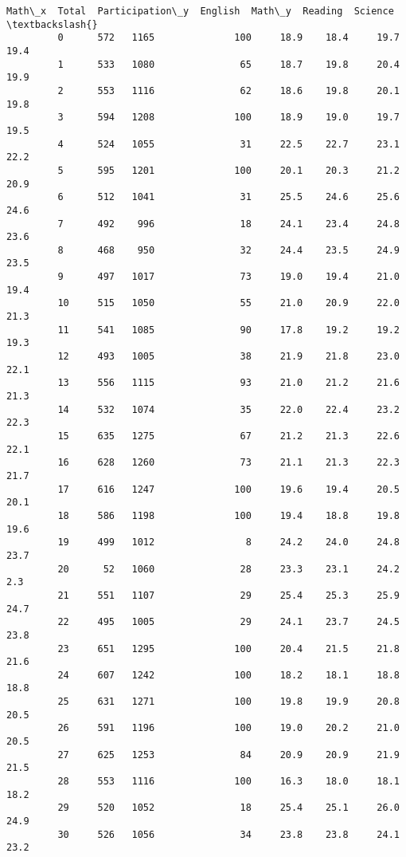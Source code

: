 \documentclass[11pt]{article}
\begin{document}
\begin{Verbatim}[commandchars=\\\{\}]
             Math\_x  Total  Participation\_y  English  Math\_y  Reading  Science  \textbackslash{}
         0      572   1165              100     18.9    18.4     19.7     19.4   
         1      533   1080               65     18.7    19.8     20.4     19.9   
         2      553   1116               62     18.6    19.8     20.1     19.8   
         3      594   1208              100     18.9    19.0     19.7     19.5   
         4      524   1055               31     22.5    22.7     23.1     22.2   
         5      595   1201              100     20.1    20.3     21.2     20.9   
         6      512   1041               31     25.5    24.6     25.6     24.6   
         7      492    996               18     24.1    23.4     24.8     23.6   
         8      468    950               32     24.4    23.5     24.9     23.5   
         9      497   1017               73     19.0    19.4     21.0     19.4   
         10     515   1050               55     21.0    20.9     22.0     21.3   
         11     541   1085               90     17.8    19.2     19.2     19.3   
         12     493   1005               38     21.9    21.8     23.0     22.1   
         13     556   1115               93     21.0    21.2     21.6     21.3   
         14     532   1074               35     22.0    22.4     23.2     22.3   
         15     635   1275               67     21.2    21.3     22.6     22.1   
         16     628   1260               73     21.1    21.3     22.3     21.7   
         17     616   1247              100     19.6    19.4     20.5     20.1   
         18     586   1198              100     19.4    18.8     19.8     19.6   
         19     499   1012                8     24.2    24.0     24.8     23.7   
         20      52   1060               28     23.3    23.1     24.2      2.3   
         21     551   1107               29     25.4    25.3     25.9     24.7   
         22     495   1005               29     24.1    23.7     24.5     23.8   
         23     651   1295              100     20.4    21.5     21.8     21.6   
         24     607   1242              100     18.2    18.1     18.8     18.8   
         25     631   1271              100     19.8    19.9     20.8     20.5   
         26     591   1196              100     19.0    20.2     21.0     20.5   
         27     625   1253               84     20.9    20.9     21.9     21.5   
         28     553   1116              100     16.3    18.0     18.1     18.2   
         29     520   1052               18     25.4    25.1     26.0     24.9   
         30     526   1056               34     23.8    23.8     24.1     23.2   

\end{Verbatim}
\end{document}

